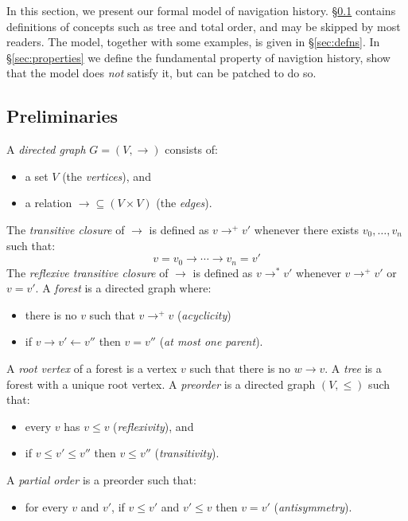 \documentclass{notes}
\newcommand{\Verts}{V}
\newcommand{\aVert}{v}
\newcommand{\bVert}{w}
\newcommand{\parentOf}{\rightarrow}
\newcommand{\childOf}{\leftarrow}
\begin{document}
In this section, we present our formal model of navigation history.
\S\ref{sec:preliminaries} contains definitions of concepts such as
tree and total order, and may be skipped by most readers. The model,
together with some examples, is given in \S\ref{sec:defns}. In
\S\ref{sec:properties} we define the fundamental property of
navigtion history, show that the model does \emph{not} satisfy
it, but can be patched to do so.

\subsection{Preliminaries}
\label{sec:preliminaries}

A \emph{directed graph} $G=(\Verts,{\parentOf})$ consists of:
\begin{itemize}
\item a set $\Verts$ (the \emph{vertices}), and
\item a relation ${\parentOf} \subseteq (\Verts\times\Verts)$ (the \emph{edges}).
\end{itemize}
The \emph{transitive closure} of $\parentOf$ is defined as $\aVert\parentOf^+\aVert'$ whenever
there exists $\aVert_0,\ldots,\aVert_n$ such that:
\[
  \aVert=\aVert_0\parentOf\cdots\parentOf\aVert_n=\aVert'
\]
The \emph{reflexive transitive closure} of $\parentOf$ is defined as $\aVert\parentOf^*\aVert'$ whenever
$\aVert\parentOf^+\aVert'$ or $\aVert=\aVert'$.
A \emph{forest} is a directed graph where:
\begin{itemize}
\item there is no $\aVert$ such that $\aVert\parentOf^+\aVert$ (\emph{acyclicity})
\item if $\aVert\parentOf\aVert'\childOf\aVert''$ then $\aVert=\aVert''$ (\emph{at most one parent}).
\end{itemize}
A \emph{root vertex} of a forest is a vertex $\aVert$ such that there is no $\bVert\parentOf\aVert$.
A \emph{tree} is a forest with a unique root vertex.
A \emph{preorder} is a directed graph $(\Verts, {\le})$ such that:
\begin{itemize}
\item every $\aVert$ has $\aVert\le\aVert$ (\emph{reflexivity}), and
\item if $\aVert\le\aVert'\le\aVert''$ then $\aVert\le\aVert''$ (\emph{transitivity}).
\end{itemize}
A \emph{partial order} is a preorder such that:
\begin{itemize}
\item for every $\aVert$ and $\aVert'$, if $\aVert\le\aVert'$ and $\aVert'\le\aVert$ then $\aVert=\aVert'$
  (\emph{antisymmetry}).
\end{itemize}
\end{document}
